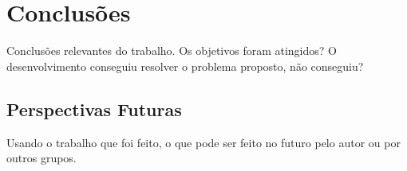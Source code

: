 

\chapter{Conclusões} \label{Chap:Conclusoes}

Conclusões relevantes do trabalho. Os objetivos foram atingidos? O
desenvolvimento conseguiu resolver o problema proposto, não conseguiu? 


\section{Perspectivas Futuras}

Usando o trabalho que foi feito, o que pode ser feito no futuro pelo
autor ou por outros grupos.
